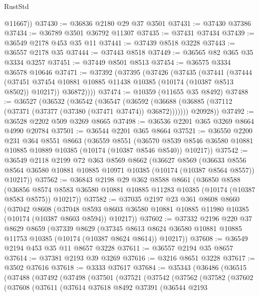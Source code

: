 \begin{lexlean}{RustStd}
\begin{coremodule}
        @11667))
@37430 := @36836 @2180 @29 @37 @3501
@37431 := @37430 @37386
@37434 := @36789 @3501 @36792 @11307
@37435 := @37431 @37434
@37439 := @36549 @2178 @453 @35 @11
@37441 := @37439 @8518 @3228
@37443 := @36557 @2178 @35
@37444 := @37443 @8518
@37449 := @36565 @82 @365 @35 @3334 @3257
@37451 := @37449 @8501 @8513
@37454 := @36575 @3334 @36578 @10646
@37471 := @37392
    (@37395
      (@37426
        (@37435
          (@37441
            (@37444
              (@37451 @37454 @10881 @10885 @11438 @10385 (@10174 (@10387 @8513 @8502)) @10217))
            @36872))))
@37474 := @10359 (@11655 @35 @8492)
@37488 := @36527
    (@36532
      (@36542
        (@36547
          (@36592 (@36688 (@36885 (@37112 (@37371 (@37377 (@37380 (@37471 @37474)) @36872)))))))
        @20928))
@37492 := @36528 @2202 @509 @3269 @8665
@37498 := @36536 @2201 @365 @3269 @8664 @4990 @20784
@37501 := @36544 @2201 @365 @8664
@37521 := @36550
    @2200
    @231
    @364
    @8551
    @8663
    (@36559
      @8551
      (@36570 @8539 @8546 @36580 @10881 @10885 @10889 @10385 (@10174 (@10387 @8546 @8540)) @10217))
@37542 := @36549
    @2118
    @2199
    @72
    @363
    @8569
    @8662
    (@36627
      @8569
      (@36633 @8556 @8564 @36580 @10881 @10885 @10971 @10385 (@10174 (@10387 @8564 @8557)) @10217))
@37562 := @36843
    @2198
    @29
    @362
    @8588
    @8661
    (@36850
      @8588
      (@36856 @8574 @8583 @36580 @10881 @10885 @11283 @10385 (@10174 (@10387 @8583 @8575)) @10217))
@37582 := @37035
    @2197
    @23
    @361
    @8608
    @8660
    (@37042
      @8608
      (@37048 @8593 @8603 @36580 @10881 @10885 @11980 @10385 (@10174 (@10387 @8603 @8594)) @10217))
@37602 := @37332
    @2196
    @220
    @37
    @8629
    @8659
    (@37339
      @8629
      (@37345 @8613 @8624 @36580 @10881 @10885 @11753 @10385 (@10174 (@10387 @8624 @8614)) @10217))
@37608 := @36549 @2194 @453 @35 @11 @8657 @3228
@37611 := @36557 @2194 @35 @8657
@37614 := @37381 @2193 @39 @3269
@37616 := @3216 @8651 @3228
@37617 := @3502 @37616
@37618 := @3333 @37617
@37684 := @35343
    (@36486
      (@36515
        (@37488
          (@37492
            (@37498
              (@37501
                (@37521
                  (@37542
                    (@37562
                      (@37582
                        (@37602
                          (@37608
                            (@37611
                              (@37614
                                @37618
                                @8492
                                @37391
                                (@36544
                                  @2193

\end{coremodule}
\end{lexlean}

